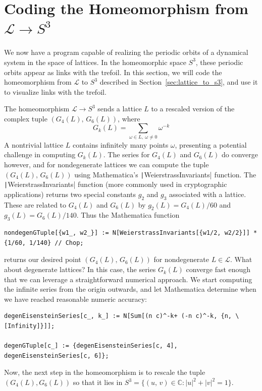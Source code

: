 \documentclass[12pt,twoside]{reedthesis}
\theoremstyle{definition}
\newcommand{\C}{\mathbb{C}}
\newcommand{\LS}{\mathcal{L}}
\begin{document}
\section{Coding the Homeomorphism from $\LS \to S^3$}

We now have a program capable of realizing the periodic orbits of a dynamical system in the space of lattices.
In the homeomorphic space $S^3$, these periodic orbits appear as links with the trefoil.
In this section, we will code the homeomorphism from $\LS$ to $S^3$ described in Section~\ref{sec:lattice_to_s3}, and use it to visualize links with the trefoil.

The homeomorphism $\LS \to S^3$ sends a lattice $L$ to a rescaled version of the complex tuple $(G_4(L),\, G_6(L))$, where
\begin{equation*}
  G_k(L) = \sum_{\omega \in L,\ \omega \neq 0} \omega^{-k}
\end{equation*}
A nontrivial lattice $L$ contains infinitely many points $\omega$, presenting a potential challenge in computing $G_k(L)$.
The series for $G_4(L)$ and $G_6(L)$ do converge however, and for nondegenerate lattices we can compute the tuple $(G_4(L),\, G_6(L))$ using Mathematica's \texttt|WeierstrassInvariants| function.
The \texttt|WeierstrassInvariants| function (more commonly used in cryptographic applications) returns two special constants $g_2$ and $g_3$ associated with a lattice.
These are related to $G_4(L)$ and $G_6(L)$ by $g_2(L) = G_4(L) / 60$ and $g_3(L) = G_6(L) / 140$.
Thus the Mathematica function
\begin{verbatim}
nondegenGTuple[{w1_, w2_}] := N[WeierstrassInvariants[{w1/2, w2/2}]] * {1/60, 1/140} // Chop;
\end{verbatim}
returns our desired point $(G_4(L),\, G_6(L))$ for nondegenerate $L \in \LS$.
What about degenerate lattices?
In this case, the series $G_k(L)$ converge fast enough that we can leverage a straightforward numerical approach.
We start computing the infinite series from the origin outwards, and let Mathematica determine when we have reached reasonable numeric accuracy:
\begin{verbatim}
degenEisensteinSeries[c_, k_] := N[Sum[(n c)^-k+ (-n c)^-k, {n, \[Infinity]}]];

degenGTuple[c_] := {degenEisensteinSeries[c, 4], degenEisensteinSeries[c, 6]};
\end{verbatim}
Now, the next step in the homeomorphism is to rescale the tuple $(G_4(L), G_6(L))$ so that it lies in $S^3 = \{(u,\, v) \in \C : |u|^2 + |v|^2 = 1\}$.
\end{document}
